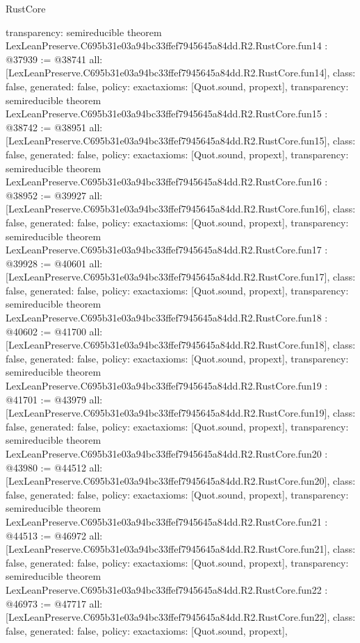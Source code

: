 \begin{lexlean}{RustCore}
\begin{coremodule}
{  transparency: semireducible
}
theorem LexLeanPreserve.C695b31e03a94bc33ffef7945645a84dd.R2.RustCore.fun14 : @37939 := @38741 {
  all: [LexLeanPreserve.C695b31e03a94bc33ffef7945645a84dd.R2.RustCore.fun14],
  class: false,
  generated: false,
  policy: exact{axioms: [Quot.sound, propext]},
  transparency: semireducible
}
theorem LexLeanPreserve.C695b31e03a94bc33ffef7945645a84dd.R2.RustCore.fun15 : @38742 := @38951 {
  all: [LexLeanPreserve.C695b31e03a94bc33ffef7945645a84dd.R2.RustCore.fun15],
  class: false,
  generated: false,
  policy: exact{axioms: [Quot.sound, propext]},
  transparency: semireducible
}
theorem LexLeanPreserve.C695b31e03a94bc33ffef7945645a84dd.R2.RustCore.fun16 : @38952 := @39927 {
  all: [LexLeanPreserve.C695b31e03a94bc33ffef7945645a84dd.R2.RustCore.fun16],
  class: false,
  generated: false,
  policy: exact{axioms: [Quot.sound, propext]},
  transparency: semireducible
}
theorem LexLeanPreserve.C695b31e03a94bc33ffef7945645a84dd.R2.RustCore.fun17 : @39928 := @40601 {
  all: [LexLeanPreserve.C695b31e03a94bc33ffef7945645a84dd.R2.RustCore.fun17],
  class: false,
  generated: false,
  policy: exact{axioms: [Quot.sound, propext]},
  transparency: semireducible
}
theorem LexLeanPreserve.C695b31e03a94bc33ffef7945645a84dd.R2.RustCore.fun18 : @40602 := @41700 {
  all: [LexLeanPreserve.C695b31e03a94bc33ffef7945645a84dd.R2.RustCore.fun18],
  class: false,
  generated: false,
  policy: exact{axioms: [Quot.sound, propext]},
  transparency: semireducible
}
theorem LexLeanPreserve.C695b31e03a94bc33ffef7945645a84dd.R2.RustCore.fun19 : @41701 := @43979 {
  all: [LexLeanPreserve.C695b31e03a94bc33ffef7945645a84dd.R2.RustCore.fun19],
  class: false,
  generated: false,
  policy: exact{axioms: [Quot.sound, propext]},
  transparency: semireducible
}
theorem LexLeanPreserve.C695b31e03a94bc33ffef7945645a84dd.R2.RustCore.fun20 : @43980 := @44512 {
  all: [LexLeanPreserve.C695b31e03a94bc33ffef7945645a84dd.R2.RustCore.fun20],
  class: false,
  generated: false,
  policy: exact{axioms: [Quot.sound, propext]},
  transparency: semireducible
}
theorem LexLeanPreserve.C695b31e03a94bc33ffef7945645a84dd.R2.RustCore.fun21 : @44513 := @46972 {
  all: [LexLeanPreserve.C695b31e03a94bc33ffef7945645a84dd.R2.RustCore.fun21],
  class: false,
  generated: false,
  policy: exact{axioms: [Quot.sound, propext]},
  transparency: semireducible
}
theorem LexLeanPreserve.C695b31e03a94bc33ffef7945645a84dd.R2.RustCore.fun22 : @46973 := @47717 {
  all: [LexLeanPreserve.C695b31e03a94bc33ffef7945645a84dd.R2.RustCore.fun22],
  class: false,
  generated: false,
  policy: exact{axioms: [Quot.sound, propext]},
}
\end{coremodule}
\end{lexlean}
